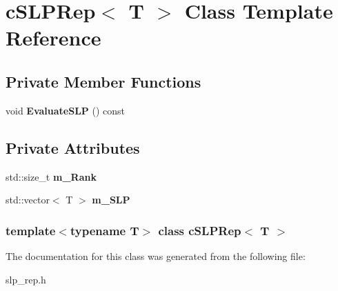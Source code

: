 \hypertarget{classcSLPRep}{\section{c\-S\-L\-P\-Rep$<$ \-T $>$ \-Class \-Template \-Reference}
\label{classcSLPRep}
}
\subsection*{\-Private \-Member \-Functions}
\begin{DoxyCompactItemize}
\item 
\hypertarget{classcSLPRep_a426437f339e324639960d31d80a88c16}{void {\bfseries \-Evaluate\-S\-L\-P} () const }\label{classcSLPRep_a426437f339e324639960d31d80a88c16}

\end{DoxyCompactItemize}
\subsection*{\-Private \-Attributes}
\begin{DoxyCompactItemize}
\item 
\hypertarget{classcSLPRep_a5da028fd67619a049145140669a44eb1}{std\-::size\-\_\-t {\bfseries m\-\_\-\-Rank}}\label{classcSLPRep_a5da028fd67619a049145140669a44eb1}

\item 
\hypertarget{classcSLPRep_a8545e9ddf3197b62c4cd38fbae189a26}{std\-::vector$<$ \-T $>$ {\bfseries m\-\_\-\-S\-L\-P}}\label{classcSLPRep_a8545e9ddf3197b62c4cd38fbae189a26}

\end{DoxyCompactItemize}
\subsubsection*{template$<$typename T$>$ class c\-S\-L\-P\-Rep$<$ T $>$}



\-The documentation for this class was generated from the following file\-:\begin{DoxyCompactItemize}
\item 
slp\-\_\-rep.\-h\end{DoxyCompactItemize}
